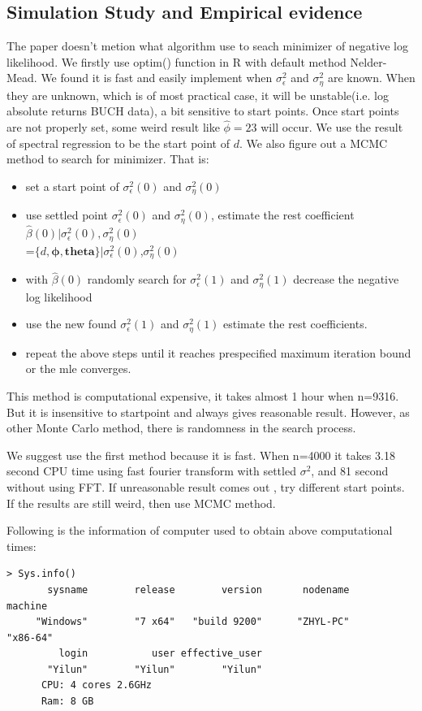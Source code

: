 \documentclass[10pt,a4paper]{article}
\begin{document}
\subsection{Simulation Study and Empirical evidence}
The paper doesn't metion what algorithm use to seach minimizer of negative log likelihood. We firstly use optim() function in R with default method Nelder-Mead. We found it is fast and easily implement when $\sigma_\epsilon^2$ and $\sigma_\eta^2$ are known. When they are unknown, which is of most practical case, it will be unstable(i.e. log absolute returns BUCH data), a bit sensitive to start points. Once start points are not properly set, some weird result like $\hat{\phi}=23$ will occur. We use the result of spectral regression to be the start point of $d$. We also figure out a MCMC method to search for minimizer. That is: 
\begin{itemize}
\item{set a start point of $\sigma_\epsilon^2(0)$ and $\sigma_\eta^2(0)$}
\item{ use settled point $\sigma_\epsilon^2(0)$ and $\sigma_\eta^2(0)$, estimate the rest coefficient $\hat{\beta}(0)|\sigma_\epsilon^2(0),\sigma_\eta^2(0)$\\=$\{d,\bm{\phi},\bm{theta}\}|\sigma_\epsilon^2(0)$,$\sigma_\eta^2(0)$}
\item{with $\hat{\beta}(0)$ randomly search for $\sigma_\epsilon^2(1)$ and $\sigma_\eta^2(1)$ decrease the negative log likelihood}
\item{use the new found $\sigma_\epsilon^2(1)$ and $\sigma_\eta^2(1)$ estimate the rest coefficients.}
\item{repeat the above steps until it reaches prespecified maximum iteration bound or the mle converges.}
\end{itemize}

This method is computational expensive, it takes almost 1 hour when n=9316. But it is insensitive to startpoint and always gives reasonable result. However, as other Monte Carlo method, there is randomness in the search process.

We suggest use the first method because it is fast. When n=4000 it takes 3.18 second CPU time using fast fourier transform with settled $\sigma^2$, and 81 second without using FFT. If unreasonable result comes out , try different start points. If the results are still weird, then use MCMC method.

Following is the information of computer used to obtain above computational times:
\begin{verbatim}
> Sys.info()
       sysname        release        version       nodename        machine 
     "Windows"        "7 x64"   "build 9200"      "ZHYL-PC"       "x86-64" 
         login           user effective_user 
       "Yilun"        "Yilun"        "Yilun"
      CPU: 4 cores 2.6GHz 
      Ram: 8 GB      
\end{verbatim}
\end{document}
